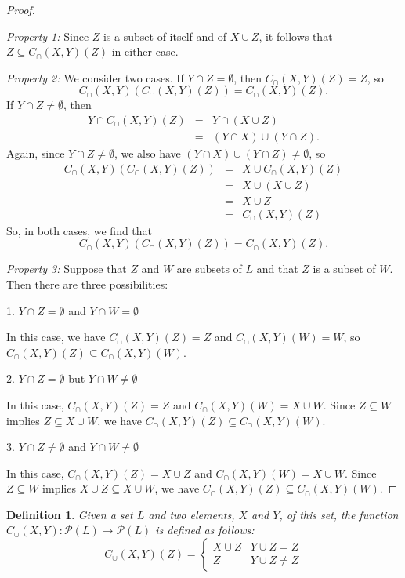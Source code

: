 \documentclass[12pt]{article}
\newtheorem{definition}{Definition}
\begin{document}
\begin{proof} ~

\emph{Property 1:}
Since $Z$ is a subset of itself and of $X \cup Z$, it follows that
$Z \subseteq C_\cap (X,Y) (Z)$ in either case.

\emph{Property 2:}
We consider two cases.  If $Y \cap Z = \emptyset$, then $C_\cap (X,Y) 
(Z) = Z$, so 
 \[C_\cap (X,Y) (C_\cap (X,Y) (Z)) = C_\cap (X,Y) (Z).\]
If $Y \cap Z \not= \emptyset$, then 
\begin{eqnarray*}
Y \cap C_\cap (X,Y) (Z) &=&
Y \cap (X \cup Z) \\
&=& (Y \cap X) \cup (Y \cap Z).
\end{eqnarray*}
Again, since $Y \cap Z \not= \emptyset$, we also
have $(Y \cap X) \cup (Y \cap Z) \not= \emptyset$, so
\begin{eqnarray*}
C_\cap (X,Y) (C_\cap (X,Y) (Z)) 
&=& X \cup C_\cap (X,Y) (Z) \\
&=& X \cup (X \cup Z) \\
&=& X \cup Z \\
&=& C_\cap (X,Y) (Z)
\end{eqnarray*}
So, in both cases, we find that 
\[C_\cap (X,Y) (C_\cap (X,Y) (Z)) = C_\cap (X,Y) (Z).\]

\emph{Property 3:}
Suppose that $Z$ and $W$ are subsets of $L$ and that $Z$ is a subset
of $W$.  Then there are three possibilities: 

1. $Y \cap Z = \emptyset$ and $Y \cap W = \emptyset$
 
In this case, we have $C_\cap (X,Y) (Z) = Z$ and
$C_\cap (X,Y) (W) = W$, so $C_\cap (X,Y) (Z) \subseteq C_\cap (X,Y) (W)$.

2. $Y \cap Z = \emptyset$ but $Y \cap W \not= \emptyset$ 

In this case, $C_\cap (X,Y) (Z) = Z$ and $C_\cap (X,Y) (W) = X \cup 
W$.  Since $Z \subseteq W$ implies $Z \subseteq X \cup W$, we have 
$C_\cap (X,Y) (Z) \subseteq C_\cap (X,Y) (W)$. 

3. $Y \cap Z \not= \emptyset$ and $Y \cap W \not= \emptyset$

In this case,
$C_\cap (X,Y) (Z) = X \cup Z$ and $C_\cap (X,Y) (W) = X \cup W$.  Since 
$Z \subseteq W$ implies $X \cup Z \subseteq X \cup W$, we have 
$C_\cap (X,Y) (Z) \subseteq C_\cap (X,Y) (W)$.

\end{proof}

\begin{definition}
Given a set $L$ and two elements, $X$ and $Y$, of this set, the 
function $C_\cup (X,Y) \colon \mathcal{P}(L) \to \mathcal{P}(L)$ 
is defined as follows:
 \[
  C_\cup (X,Y)(Z) = 
  \begin{cases}  
   X \cup Z & Y \cup Z = Z \\ 
   Z & Y \cup Z \not= Z 
  \end{cases}
 \]
\end{definition}
\end{document}
